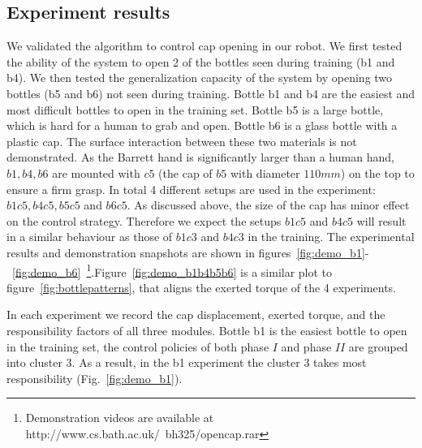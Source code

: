 \subsection{Experiment results}
\label{cha4:sec3:result}


We validated the algorithm to control cap opening in our robot. We first tested the ability of the system to open 2 of the bottles seen during training (b1 and b4). We then tested the generalization capacity of the system by opening two bottles (b5 and b6) not seen during training.
Bottle b1 and b4 are the easiest and most difficult bottles to open in the training set.
Bottle b5 is a large bottle, which is hard for a human to grab and open. Bottle b6 is a glass bottle with a plastic cap. The surface interaction between these two materials is not demonstrated. As the Barrett hand is significantly larger than a human hand, $b1, b4, b6$ are mounted with $c5$ (the cap of $b5$ with diameter $110 mm$) on the top to ensure a firm grasp. In total 4 different setups are used in the experiment: $b1c5, b4c5, b5c5$ and $b6c5$. As discussed above, the size of the cap has minor effect on the control strategy. Therefore we expect the setups $b1c5$ and $b4c5$ will result in a similar behaviour as those of $b1c3$ and $b4c3$ in the training. The experimental results and demonstration snapshots are shown in figures~\ref{fig:demo_b1}-~\ref{fig:demo_b6}~\footnote{Demonstration
  videos are available at http://www.cs.bath.ac.uk/~bh325/opencap.rar}.Figure~\ref{fig:demo_b1b4b5b6} is a similar plot to figure~\ref{fig:bottlepatterns}, that aligns the exerted torque of the 4 experiments.

In each experiment we record the cap displacement, exerted torque, and the responsibility factors of all three modules. Bottle b1 is the easiest bottle to open in the training set, the control policies of both phase $I$ and phase $II$ are grouped into cluster 3. As a result, in the b1 experiment the cluster 3 takes most responsibility (Fig.~\ref{fig:demo_b1}).

